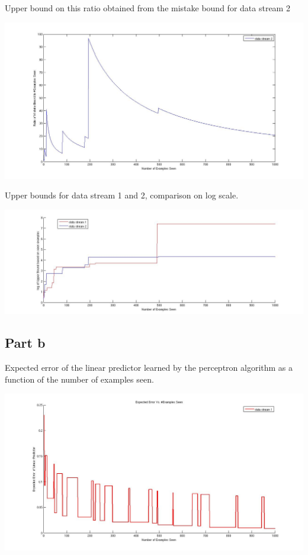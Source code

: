 \documentclass[twoside,10pt,a4paper]{article}
\theoremstyle{definition}
\theoremstyle{definition}
\theoremstyle{remark}
\renewcommand{\>}{{\rightarrow}}
\newcommand{\1}{{\mathbf 1}}
\newcommand{\0}{{\mathbf 0}}
\begin{document}
Upper bound on this ratio obtained from the mistake bound for data stream 2 \\

 \begin{center}
 \includegraphics[scale=0.4]{./finale/2a3}
\end{center}

Upper bounds for data stream 1 and 2, comparison on log scale. \\

 \begin{center}
 \includegraphics[scale=0.4]{./ub2log.jpg}
\end{center}

\subsection{Part b}
Expected error of the linear predictor learned by the perceptron algorithm as a function of the number of examples seen. \\

\begin{center}
 \includegraphics[scale=0.37,keepaspectratio=true]{./finale/2b1}
\end{center}
 
\end{document}
